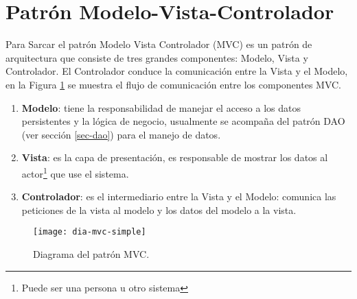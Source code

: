 \section{Patrón Modelo-Vista-Controlador}\label{sec-mvc}
Para Sarcar\cite{JavaDesignPatternsExamples} el patrón Modelo Vista Controlador (MVC) es un patrón de arquitectura que consiste de tres grandes componentes: Modelo, Vista y Controlador. El Controlador conduce la comunicación entre la Vista y el Modelo, en la Figura \ref{fig:dia-mvc-simple} se muestra el flujo de comunicación entre los componentes MVC.
\begin{enumerate}
	\item \textbf{Modelo}: tiene la responsabilidad de manejar el acceso a los datos persistentes y la lógica de negocio, usualmente se acompaña del patrón DAO (ver sección \ref{sec-dao}) para el manejo de datos.
	\item \textbf{Vista}: es la capa de presentación, es responsable de mostrar los datos al actor\footnote{Puede ser una persona u otro sistema} que use el sistema.
	\item \textbf{Controlador}: es el intermediario entre la Vista y el Modelo: comunica las peticiones de la vista al modelo y los datos del modelo a la vista.
\end{enumerate}
\begin{figure}[h]
  \centering
  \texttt{[image: dia-mvc-simple]}
  \caption{Diagrama del patrón MVC\cite{JavaDesignPatternsExamples}.}
  \label{fig:dia-mvc-simple}
\end{figure}




